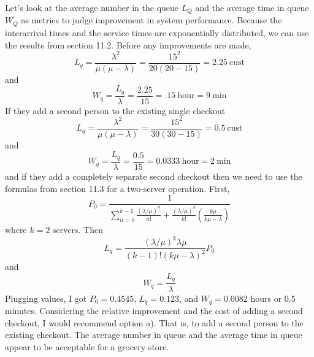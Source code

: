 \begin{enumerate}
\begin{solution}
\bs Let's look at the average number in the queue $L_Q$ and the
average time in queue $W_Q$ as metrics to judge improvement in
system performance. Because the interarrival times and the service
times are exponentially distributed, we can use the results from
section 11.2. Before any improvements are made,
\[ L_q = \frac{\lambda^2}{\mu(\mu-\lambda)} = \frac{15^2}{20(20-15)} = 2.25~\text{cust} \]
and
\[W_q = \frac{L_q}{\lambda} = \frac{2.25}{15} = .15~\text{hour} = 9~\text{min} \]
If they add a second person to the existing single checkout
\[ L_q = \frac{\lambda^2}{\mu(\mu-\lambda)} = \frac{15^2}{30(30-15)} = 0.5~\text{cust} \]
and
\[W_q = \frac{L_q}{\lambda} = \frac{0.5}{15} = 0.0333~\text{hour} = 2~\text{min} \]
and if they add a completely separate second checkout then we
need to use the formulas from section 11.3 for a two-server operation. First,
\[ P_0 = \frac{1}{\sum_{n=0}^{k-1}\frac{\left(\lambda/\mu\right)^n}{n!} + \frac{\left(\lambda/\mu\right)^k}{k!}\left(\frac{k\mu}{k\mu-\lambda}\right)} \]
where $k=2$ servers. Then
\[ L_q = \frac{\left(\lambda/\mu\right)^k\lambda\mu}{(k-1)!(k\mu-\lambda)^2}P_0 \]
and
\[W_q = \frac{L_q}{\lambda}  \]
Plugging values, I got $P_0=0.4545$, $L_q=0.123$, and $W_q=0.0082$ hours or 0.5 minutes.
Considering the relative improvement and the cost
of adding a second checkout, I would recommend option a). That is, to
add a second person to the existing checkout. The average number in
queue and the average time in queue appear to be acceptable for a
grocery store.
\end{solution}


\end{enumerate}
